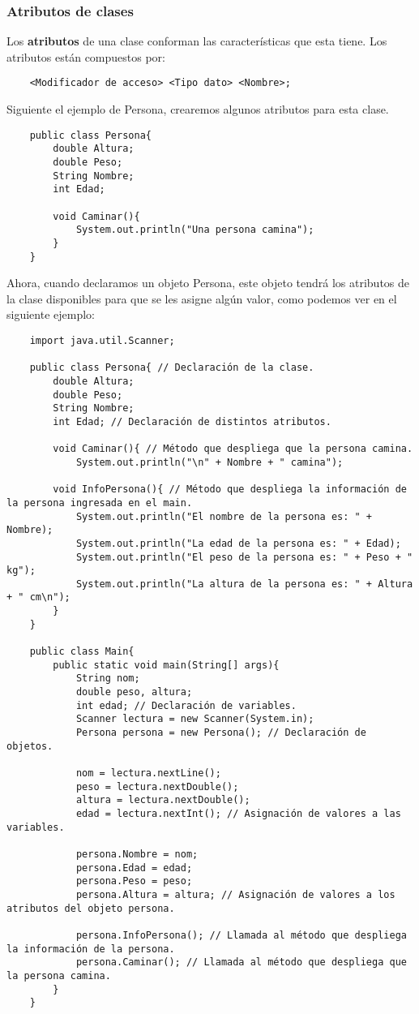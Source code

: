 \subsubsection{Atributos de clases}

Los \textbf{atributos} de una clase conforman las características que esta tiene. Los atributos están compuestos por:
\begin{lstlisting}
    <Modificador de acceso> <Tipo dato> <Nombre>;
\end{lstlisting}

Siguiente el ejemplo de Persona, crearemos algunos atributos para esta clase.
\begin{lstlisting}
    public class Persona{
        double Altura;
        double Peso;
        String Nombre;
        int Edad;
    
        void Caminar(){
            System.out.println("Una persona camina");
        }
    }
\end{lstlisting}

Ahora, cuando declaramos un objeto Persona, este objeto tendrá los atributos de la clase disponibles para que se les asigne algún valor, como podemos ver en el siguiente ejemplo:
\begin{lstlisting}
    import java.util.Scanner;
    
    public class Persona{ // Declaración de la clase.
        double Altura;
        double Peso;
        String Nombre;
        int Edad; // Declaración de distintos atributos.
    
        void Caminar(){ // Método que despliega que la persona camina.
            System.out.println("\n" + Nombre + " camina");
        
        void InfoPersona(){ // Método que despliega la información de la persona ingresada en el main.
            System.out.println("El nombre de la persona es: " + Nombre);
            System.out.println("La edad de la persona es: " + Edad);
            System.out.println("El peso de la persona es: " + Peso + " kg");
            System.out.println("La altura de la persona es: " + Altura + " cm\n");
        }
    }
    
    public class Main{
        public static void main(String[] args){
            String nom;
            double peso, altura;
            int edad; // Declaración de variables.
            Scanner lectura = new Scanner(System.in);
            Persona persona = new Persona(); // Declaración de objetos.
            
            nom = lectura.nextLine();
            peso = lectura.nextDouble();
            altura = lectura.nextDouble();
            edad = lectura.nextInt(); // Asignación de valores a las variables.
            
            persona.Nombre = nom;
            persona.Edad = edad;
            persona.Peso = peso;
            persona.Altura = altura; // Asignación de valores a los atributos del objeto persona.
            
            persona.InfoPersona(); // Llamada al método que despliega la información de la persona.
            persona.Caminar(); // Llamada al método que despliega que la persona camina.
        }
    }
\end{lstlisting}


